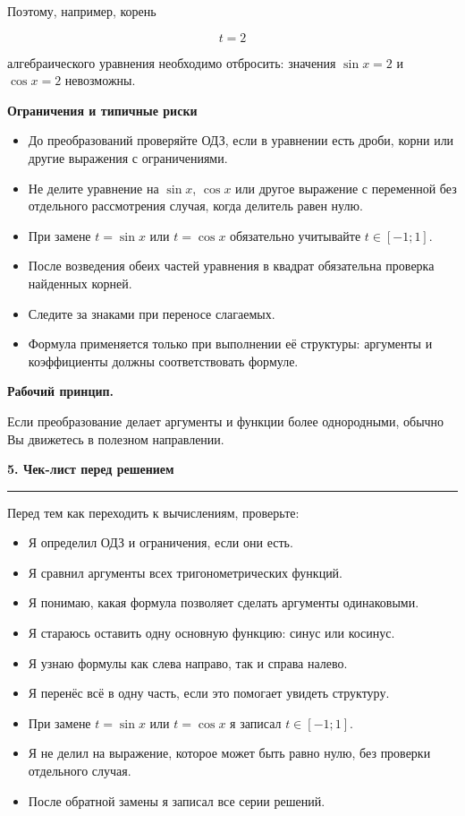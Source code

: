 \documentclass[a4paper,12pt]{article}
\newcommand{\maintitle}[1]{%
  {\Large\bfseries\color{darkaccent}#1\par}
  \vspace{0.5em}
  {\color{accent}\rule{\linewidth}{0.7pt}\par}
  \vspace{0.8em}
}
\newcommand{\subheading}[1]{%
  \vspace{0.7em}
  {\large\bfseries\color{darkaccent}#1\par}
  \vspace{0.25em}
}
\newcommand{\important}[1]{%
  \par\noindent
  {\bfseries\color{darkaccent}#1}
}
\begin{document}
Поэтому, например, корень

\[
t=2
\]

алгебраического уравнения необходимо отбросить:
значения \(\sin x=2\) и \(\cos x=2\) невозможны.

\subheading{Ограничения и типичные риски}

\begin{itemize}
  \item До преобразований проверяйте ОДЗ, если в уравнении есть дроби, корни или другие выражения с ограничениями.
  \item Не делите уравнение на \(\sin x\), \(\cos x\) или другое выражение с переменной без отдельного рассмотрения случая, когда делитель равен нулю.
  \item При замене \(t=\sin x\) или \(t=\cos x\) обязательно учитывайте \(t\in[-1;1]\).
  \item После возведения обеих частей уравнения в квадрат обязательна проверка найденных корней.
  \item Следите за знаками при переносе слагаемых.
  \item Формула применяется только при выполнении её структуры: аргументы и коэффициенты должны соответствовать формуле.
\end{itemize}

\important{Рабочий принцип.}
Если преобразование делает аргументы и функции более однородными,
обычно Вы движетесь в полезном направлении.


\maintitle{5. Чек-лист перед решением}

Перед тем как переходить к вычислениям, проверьте:

\begin{itemize}
  \item[$\square$] Я определил ОДЗ и ограничения, если они есть.
  \item[$\square$] Я сравнил аргументы всех тригонометрических функций.
  \item[$\square$] Я понимаю, какая формула позволяет сделать аргументы одинаковыми.
  \item[$\square$] Я стараюсь оставить одну основную функцию: синус или косинус.
  \item[$\square$] Я узнаю формулы как слева направо, так и справа налево.
  \item[$\square$] Я перенёс всё в одну часть, если это помогает увидеть структуру.
  \item[$\square$] При замене \(t=\sin x\) или \(t=\cos x\) я записал \(t\in[-1;1]\).
  \item[$\square$] Я не делил на выражение, которое может быть равно нулю, без проверки отдельного случая.
  \item[$\square$] После обратной замены я записал все серии решений.
\end{itemize}
\end{document}
